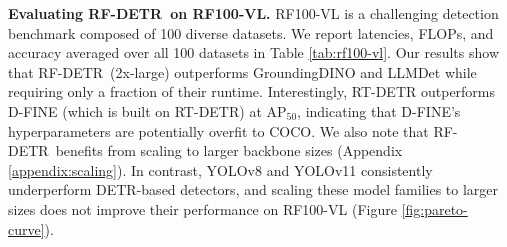 \documentclass{article} %
\newcommand\isaac[1]{\textcolor{purered}{[Isaac: #1]}}
\newcommand{\method}{RF-DETR}
\begin{document}
\textbf{Evaluating \method \ on RF100-VL.} RF100-VL is a challenging detection benchmark composed of 100 diverse datasets. We report  latencies, FLOPs, and accuracy averaged over all 100 datasets in Table \ref{tab:rf100-vl}. Our results show that \method \ (2x-large) outperforms GroundingDINO and LLMDet while requiring only a fraction of their runtime. Interestingly, RT-DETR outperforms D-FINE (which is built on RT-DETR) at AP$_{50}$, indicating that D-FINE's hyperparameters are potentially overfit to COCO. %
We also note that \method \ benefits from scaling to larger backbone sizes (Appendix \ref{appendix:scaling}). In contrast, YOLOv8 and YOLOv11 consistently underperform DETR-based detectors, and scaling these model families to larger sizes does not improve their performance on RF100-VL (Figure \ref{fig:pareto-curve}). %
\end{document}
